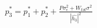 \documentclass[preview]{standalone}
\begin{document}
\begin{align*}
p_3^\ast = p_1^\ast + p_2^\ast + \frac{P \sigma_\epsilon^2 + W_{tot} \sigma^2}{\left|\hat{h_3}\right|^2}
\end{align*}
\end{document}
